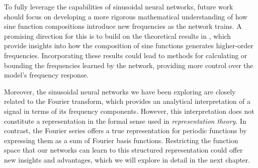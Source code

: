 To fully leverage the capabilities of sinusoidal neural networks, future work should focus on developing a more rigorous mathematical understanding of how sine function compositions introduce new frequencies as the network trains. A promising direction for this is to build on the theoretical results in \cite{novello2022understanding}, which provide insights into how the composition of sine functions generates higher-order frequencies. Incorporating these results could lead to methods for calculating or bounding the frequencies learned by the network, providing more control over the model's frequency response.

Moreover, the sinusoidal neural networks we have been exploring are closely related to the Fourier transform, which provides an analytical interpretation of a signal in terms of its frequency components. However, this interpretation does not constitute a representation in the formal sense used in \textit{representation theory}. In contrast, the Fourier series offers a true representation for periodic functions by expressing them as a sum of Fourier basis functions. Restricting the function space that our networks can learn to this structured representation could offer new insights and advantages, which we will explore in detail in the next chapter.